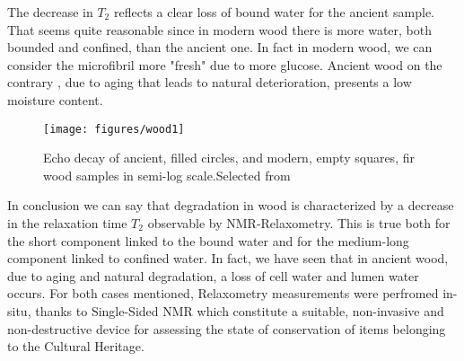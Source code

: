 \documentclass[a4paper,11pt]{report}
\begin{document}
 The decrease in $T_2$ reflects a clear loss of bound water for the ancient sample. That seems quite reasonable since in modern wood there is more water, both bounded and confined, than the ancient one. In fact in modern wood, we can consider the microfibril more "fresh" due to more glucose. Ancient wood on the contrary , due to aging that leads to natural deterioration, presents a low moisture content.
\begin{figure}[ht]
	\centering
	\texttt{[image: figures/wood1]}
	\caption{Echo decay of ancient, filled circles, and modern, empty squares, fir wood samples in semi-log scale.Selected from \cite{quattrowood} }\label{wood1}
\end{figure}

In conclusion we can say that degradation in wood is characterized by a decrease in the relaxation time $T_2$ observable by NMR-Relaxometry. This is true both for the short component linked to the bound water and for the medium-long component linked to confined water. In fact, we have seen that in ancient wood, due to aging and natural degradation, a loss of cell water and lumen water occurs. For both cases mentioned, Relaxometry measurements were perfromed in-situ, thanks to Single-Sided NMR which constitute a suitable, non-invasive and non-destructive device for assessing the state of conservation of items belonging to the Cultural Heritage.
\end{document}
